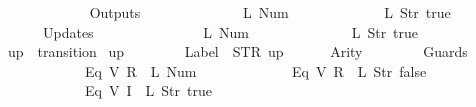 \begin{isabellebody}
\ \ \ \ \ \ {\isacharbrackright}{\isacharcomma}\isanewline
\ \ \ \ \ \ Outputs\ {\isacharequal}\ {\isacharbrackleft}\isanewline
\ \ \ \ \ \ \ \ \ \ \ \ {\isacharparenleft}L\ {\isacharparenleft}Num\ {}{\isacharparenright}{\isacharparenright}{\isacharcomma}\isanewline
\ \ \ \ \ \ \ \ \ \ \ \ {\isacharparenleft}L\ {\isacharparenleft}Str\ {\isacharprime}{\isacharprime}true{\isacharprime}{\isacharprime}{\isacharparenright}{\isacharparenright}\isanewline
\ \ \ \ \ \ {\isacharbrackright}{\isacharcomma}\isanewline
\ \ \ \ \ \ Updates\ {\isacharequal}\ {\isacharbrackleft}\isanewline
\ \ \ \ \ \ \ \ \ \ \ \ {\isacharparenleft}{}{\isacharcomma}\ {\isacharparenleft}L\ {\isacharparenleft}Num\ {}{\isacharparenright}{\isacharparenright}{\isacharparenright}{\isacharcomma}\isanewline
\ \ \ \ \ \ \ \ \ \ \ \ {\isacharparenleft}{}{\isacharcomma}\ {\isacharparenleft}L\ {\isacharparenleft}Str\ {\isacharprime}{\isacharprime}true{\isacharprime}{\isacharprime}{\isacharparenright}{\isacharparenright}{\isacharparenright}\isanewline
\ \ \ \ \ \ {\isacharbrackright}\isanewline
{\isasymrparr}{\isachardoublequoteclose}\isanewline
\isanewline
{}\isamarkupfalse%
\ {\isachardoublequoteopen}up{}{}{\isachardoublequoteclose}\ {\isacharcolon}{\isacharcolon}\ {\isachardoublequoteopen}transition{\isachardoublequoteclose}\ \isanewline
{\isachardoublequoteopen}up{}{}\ {\isasymequiv}\ {\isasymlparr}\isanewline
\ \ \ \ \ \ Label\ {\isacharequal}\ STR\ {\isacharprime}{\isacharprime}up{\isacharprime}{\isacharprime}{\isacharcomma}\isanewline
\ \ \ \ \ \ Arity\ {\isacharequal}\ {}{\isacharcomma}\isanewline
\ \ \ \ \ \ Guards\ {\isacharequal}\ {\isacharbrackleft}\isanewline
\ \ \ \ \ \ \ \ \ \ \ \ {\isacharparenleft}Eq\ {\isacharparenleft}V\ {\isacharparenleft}R\ {}{\isacharparenright}{\isacharparenright}\ {\isacharparenleft}L\ {\isacharparenleft}Num\ {}{\isacharparenright}{\isacharparenright}{\isacharparenright}{\isacharcomma}\isanewline
\ \ \ \ \ \ \ \ \ \ \ \ {\isacharparenleft}Eq\ {\isacharparenleft}V\ {\isacharparenleft}R\ {}{\isacharparenright}{\isacharparenright}\ {\isacharparenleft}L\ {\isacharparenleft}Str\ {\isacharprime}{\isacharprime}false{\isacharprime}{\isacharprime}{\isacharparenright}{\isacharparenright}{\isacharparenright}{\isacharcomma}\isanewline
\ \ \ \ \ \ \ \ \ \ \ \ {\isacharparenleft}Eq\ {\isacharparenleft}V\ {\isacharparenleft}I\ {}{\isacharparenright}{\isacharparenright}\ {\isacharparenleft}L\ {\isacharparenleft}Str\ {\isacharprime}{\isacharprime}true{\isacharprime}{\isacharprime}{\isacharparenright}{\isacharparenright}{\isacharparenright}{\isacharcomma}\isanewline

\end{isabellebody}
